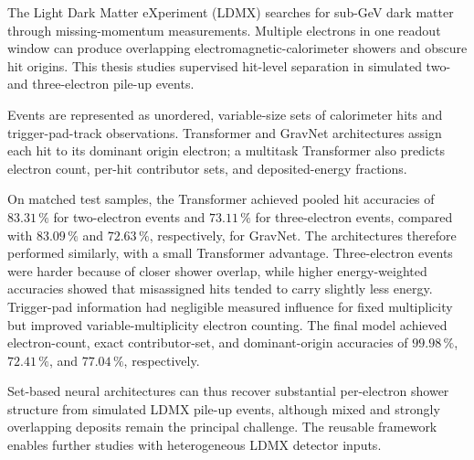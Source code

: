 \noindent

The Light Dark Matter eXperiment (LDMX) searches for sub-GeV dark matter
through missing-momentum measurements. Multiple electrons in one readout
window can produce overlapping electromagnetic-calorimeter showers and
obscure hit origins. This thesis studies supervised hit-level separation in
simulated two- and three-electron pile-up events.

Events are represented as unordered, variable-size sets of calorimeter hits
and trigger-pad-track observations. Transformer and GravNet architectures
assign each hit to its dominant origin electron; a multitask Transformer also
predicts electron count, per-hit contributor sets, and deposited-energy
fractions.

On matched test samples, the Transformer achieved pooled hit accuracies of
\(83.31\,\%\) for two-electron events and \(73.11\,\%\) for three-electron
events, compared with \(83.09\,\%\) and \(72.63\,\%\), respectively, for
GravNet. The architectures therefore performed similarly, with a small
Transformer advantage. Three-electron events were harder because of closer
shower overlap, while higher energy-weighted accuracies showed that
misassigned hits tended to carry slightly less energy. Trigger-pad information had
negligible measured influence for fixed multiplicity but improved
variable-multiplicity electron counting. The final model achieved
electron-count, exact contributor-set, and dominant-origin accuracies of
\(99.98\,\%\), \(72.41\,\%\), and \(77.04\,\%\), respectively.

Set-based neural architectures can thus recover substantial per-electron
shower structure from simulated LDMX pile-up events, although mixed and
strongly overlapping deposits remain the principal challenge. The reusable
framework enables further studies with heterogeneous LDMX detector inputs.































